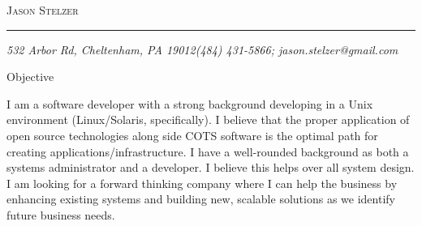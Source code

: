 \documentclass[11pt,oneside]{article}
\makeatletter
\newcommand{\name}{Jason Stelzer}
\newcommand{\addr}{532 Arbor Rd, Cheltenham, PA 19012}
\newcommand{\phone}{(484) 431-5866}
\newcommand{\email}{jason.stelzer@gmail.com}
\newcommand{\bigname}[1]{
	\begin{center}\fontfamily{phv}\selectfont\Huge\scshape#1\end{center}
}
\newenvironment{objsection}[1]{
  \vspace{4pt}
  {\fontfamily{phv}\selectfont\Large#1}
  
  \vspace{3pt}
}
\makeatother
\begin{document}
 \selectfont

\bigname{\name}

\vspace{-8pt} \rule{\textwidth}{1pt}

\vspace{-1pt} {\small\itshape \addr \hfill \phone; \email}

\vspace{8 pt}


\begin{objsection}{Objective}          
I am a software developer with a strong background developing in a Unix environment (Linux/Solaris, specifically). I believe that the proper application of open source technologies along side COTS software is the optimal path for creating applications/infrastructure. I have a well-rounded background as both a systems administrator and a developer. I believe this helps over all system design. I am looking for a forward thinking company where I can help the business by enhancing existing systems and building new, scalable solutions as we identify future business needs.
\end{objsection}
\end{document}
